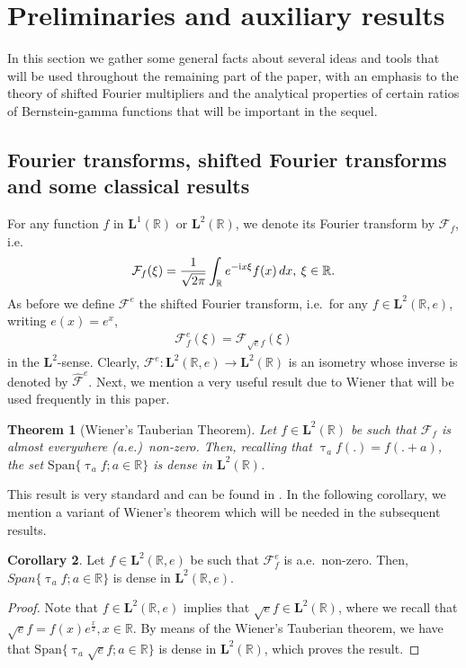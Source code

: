 \documentclass[12pt]{amsart}
\newcommand{\hlabel}{\phantomsection\label}
\numberwithin{equation}{section}
\newcommand{\bb}{\mathbb}
\newcommand{\hpt}[2]{#2}
\newcommand{\tredd}{\textcolor{red}}
\newcommand{\bmrm}[2][2]{\mathbf{#2}^{#1}}
\newcommand{\Span}{\mathrm{Span}}
\newcommand{\fou}{\mathcal{F}}
\renewcommand{\tau}{\uptau}
\renewcommand{\tredd}{}
\newtheorem{thm}{Theorem}[section]
\theoremstyle{definition}
\theoremstyle{assump}
\newtheorem{corr}[thm]{Corollary}
\theoremstyle{remark}
\begin{document}
\section{Preliminaries and auxiliary results} \hlabel{sec:prelim}
In this section we gather some general facts about several ideas and tools that will be used throughout the remaining part of the paper, with an emphasis  to the  theory of shifted Fourier multipliers and the analytical properties of certain ratios of Bernstein-gamma functions that will be important in the sequel.

\subsection{Fourier transforms, shifted Fourier transforms and some classical results}
For any function $f$ in $\bmrm[1]{L}(\bb{R})$ or $\bmrm{L}(\bb{R})$, we denote its Fourier transform by $\mathcal{F}_{f}$, i.e.~
\begin{equation*}
\fou_f(\xi)=\frac{1}{\sqrt{2\pi}}\int_{\bb{R}} e^{-{\rm{i}}x\xi} f(x)\,dx,\:  \xi\in\bb{R}.
\end{equation*} As before we define $\fou^{e}$ the shifted Fourier transform, i.e.~for any $f\in\bmrm{L}(\bb{R},e)$, writing $e(x)=e^{x}$,
\begin{align}
\fou^{e}_f(\xi)=\fou_{\sqrt{e}f} (\xi)
\end{align}
in the $\bmrm{L}$-sense. Clearly, $\fou^{e}: \bmrm{L}(\bb{R},e)\to\bmrm{L}(\bb{R})$ is an isometry whose inverse is denoted by $\widehat{\fou}^{e}$. Next, we mention a very useful result due to Wiener that will be used frequently in this paper.
\begin{thm}[Wiener's Tauberian Theorem] \hlabel{thm:WT}
Let $f\in\bmrm{L}(\bb{R})$ be such that $\mathcal{F}_{f}$ is almost everywhere (a.e.)~non-zero. Then, recalling that $\tau_af(.)=f(.+a)$, the set $\Span\{\tau_af; a\in\bb{R}\}$ is dense in $\bmrm{L}(\bb{R})$.
\end{thm}
This result is very standard and can be found in \cite{BGT}. In the following corollary, we mention a variant of Wiener's theorem which will be needed in the subsequent results.
\begin{corr}\label{corr:wiener}
Let $f\in\bmrm{L}(\bb{R},e)$  be such that $\fou^{e}_f$ is a.e.~non-zero. Then, \hpt{R5}{$Span\{\tau_a f; a\in\bb{R}\}$ is dense in $\bmrm{L}(\bb{R},e)$}.
\end{corr}
\begin{proof}
Note that $f\in\bmrm{L}(\bb{R},e)$ implies that $\sqrt{e}f\in\bmrm{L}(\bb{R})$, where we recall that $\sqrt{e}f=f(x)e^{\frac{x}{2}}, x\in \bb{R}$. By means of  the Wiener's Tauberian theorem, we have that $\tredd{\Span\{\tau_a \sqrt{e}f; a\in\bb{R}\}}$ is dense in $\bmrm{L}(\bb{R})$, which proves the result.
\end{proof}
\end{document}
